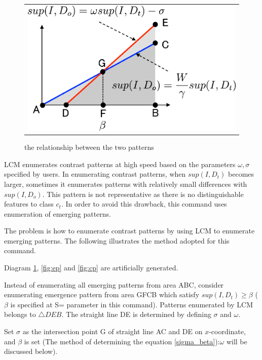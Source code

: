 \begin{figure}[htbp]
\begin{center}
\begin{tabular}{c}
\begin{minipage}{0.3\hsize}
\begin{center}
\includegraphics[scale=0.5]{./epcp.eps}
\caption{the relationship between the two patterns\label{fig:epcp}}
\end{center}
\end{minipage}


\end{tabular} 
\end{center}
\end{figure} 

LCM enumerates contrast patterns at high speed based on the parameters $\omega, \sigma$ specified by users.
In enumerating contrast patterns, when $sup(I,D_t)$  becomes larger, sometimes it enumerates patterns with relatively small differences with $sup(I,D_o)$. This pattern is not representative as there is no distinguishable features to class $c_t$.
In order to avoid this drawback, this command uses enumeration of emerging patterns. 

The problem is how to enumerate contrast patterns by using LCM to enumerate emerging patterns. The following illustrates the method adopted for this command.

Diagram \ref{fig:epcp}, \ref{fig:ep} and \ref{fig:cp} are artificially generated.

Instead of enumerating all emerging patterns from area ABC, consider enumerating  emergence pattern from area GFCB which satisfy $sup(I,D_t)\ge\beta$ ($\beta$ is specified at S= parameter in this command).
Patterns enumerated by LCM belongs to $\triangle{DEB}$. The straight line DE is determined by defining $\sigma$ and $\omega$.

Set $\sigma$ as the intersection point G of straight line AC and DE on $x$-coordinate,  and $\beta$ is set  (The method of determining the equation \ref{sigma_beta}):$\omega$ will be discussed below).

